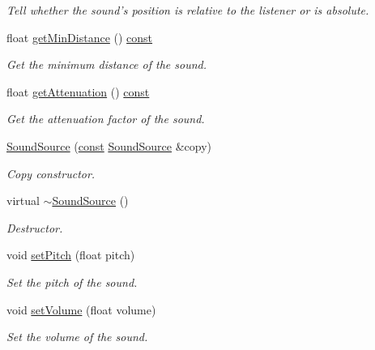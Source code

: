 \begin{DoxyCompactItemize}
\begin{DoxyCompactList}\small\item\em Tell whether the sound's position is relative to the listener or is absolute. \end{DoxyCompactList}\item 
float \hyperlink{classsf_1_1_sound_source_a3379b9f7a0f0e31ab9a4e5fa1762986e}{get\-Min\-Distance} () \hyperlink{term__entry_8h_a57bd63ce7f9a353488880e3de6692d5a}{const} 
\begin{DoxyCompactList}\small\item\em Get the minimum distance of the sound. \end{DoxyCompactList}\item 
float \hyperlink{classsf_1_1_sound_source_ac5f5ffef8930bb573f43d47cbc779bf6}{get\-Attenuation} () \hyperlink{term__entry_8h_a57bd63ce7f9a353488880e3de6692d5a}{const} 
\begin{DoxyCompactList}\small\item\em Get the attenuation factor of the sound. \end{DoxyCompactList}\item 
\hyperlink{classsf_1_1_sound_source_ae0c7728c1449fdebe65749ab6fcb3170}{Sound\-Source} (\hyperlink{term__entry_8h_a57bd63ce7f9a353488880e3de6692d5a}{const} \hyperlink{classsf_1_1_sound_source}{Sound\-Source} \&copy)
\begin{DoxyCompactList}\small\item\em Copy constructor. \end{DoxyCompactList}\item 
virtual \hyperlink{classsf_1_1_sound_source_a77c7c1524f8cb81df2de9375b0f87c5c}{$\sim$\-Sound\-Source} ()
\begin{DoxyCompactList}\small\item\em Destructor. \end{DoxyCompactList}\item 
void \hyperlink{classsf_1_1_sound_source_a72a13695ed48b7f7b55e7cd4431f4bb6}{set\-Pitch} (float pitch)
\begin{DoxyCompactList}\small\item\em Set the pitch of the sound. \end{DoxyCompactList}\item 
void \hyperlink{classsf_1_1_sound_source_a2f192f2b49fb8e2b82f3498d3663fcc2}{set\-Volume} (float volume)
\begin{DoxyCompactList}\small\item\em Set the volume of the sound. \end{DoxyCompactList}\item 

\end{DoxyCompactItemize}
